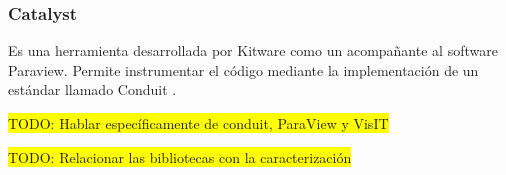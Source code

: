 \subsubsection{Catalyst}
Es una herramienta desarrollada por Kitware como un acompañante al software Paraview. Permite instrumentar el código mediante la implementación de un estándar llamado Conduit \cite{Ayachit2021}.


\colorbox{yellow}{TODO: Hablar específicamente de conduit, ParaView y VisIT}

\colorbox{yellow}{TODO: Relacionar las bibliotecas con la caracterización}
